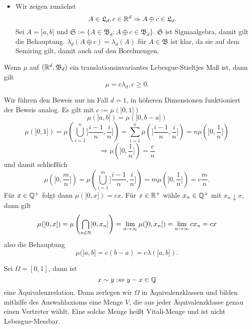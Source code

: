 			\begin{bew}
				$\text{   }$
				\begin{itemize}
					\item Wir zeigen zunächst
					\[  A\in\mathfrak{L}_d, c\in\mathbb{R}^d\Rightarrow A\oplus c\in \mathfrak{L}_d. \]
					Sei $A=]a,b]$ und $\mathfrak{S}:=\{A\in\mathfrak{B}_d: A\oplus c\in \mathfrak{B}_d\}$. $\mathfrak{S}$ ist Sigmaalgebra, damit gilt die Behauptung. $\lambda_d(A\oplus c)=\lambda_d(A)$ für $A\in\mathfrak{B}$ ist klar, da sie auf dem Semiring gilt, damit auch auf den Borelmengen. 
				\end{itemize}
			\end{bew}
			
			\begin{satz}
				Wenn $\mu$ auf $(\mathbb{R}^d, \mathfrak{B}_d)$ ein translationsinvariantes Lebesgue-Stieltjes Maß ist, dann gilt
				\[ \mu=c\lambda_d, c\ge 0. \]
			\end{satz}
			
			\begin{bew}
				Wir führen den Beweis nur im Fall $d=1$, in höheren Dimensionen funktioniert der Beweis analog.\newline
				Es gilt mit $c:=\mu(]0,1])$
				\[ \mu(]a,b])=\mu(]0,b-a]) \]
				\[ \mu(]0,1])=\mu\left(\bigcup_{i=1}^n ]\frac{i-1}{n},\frac{i}{n}]\right)=\sum_{i=1}^{n}\mu(]\frac{i-1}{n},\frac{i}{n}])=n\mu(]0,\frac{1}{n}])
				\]
				\[ \Rightarrow \mu(]0,\frac{1}{n}])=\frac{c}{n} \]
				und damit schließlich
				\[ \mu(]0,\frac{m}{n}])=\mu\left(\bigcup_{i=1}^m]\frac{i-1}{n},\frac{i}{n}]\right)=m\mu(]0,\frac{1}{n}])=c\frac{m}{n}. \]
				Für $x\in\mathbb{Q}^+$ folgt dann $\mu(]0,x])=cx$. Für $x\in\mathbb{R}^+$ wähle $x_n\in\mathbb{Q}^+$ mit $x_n\downarrow x$, dann gilt
				\[ \mu(]0,x])=\mu\left(\bigcap_{n\in\mathbb{N}} ]0,x_n]\right)=\lim\limits_{n\to\infty}\mu(]0,x_n])=\lim\limits_{n\to \infty}cx_n=cx \]
				also die Behauptung
				\[ \mu(]a,b]=c(b-a)=c\lambda(]a,b]). \]
			\end{bew}
			
			\begin{defi}
				Sei $\Omega=[0,1]$, dann ist 
				\[ x\sim y:\Leftrightarrow y-x\in \mathbb{Q} \]
				eine Äquivalenzrelation.\newline
				Dann zerlegen wir $\Omega$ in Äquivalenzklassen und bilden mithilfe des Auswahlaxioms eine Menge $V$, die aus jeder Äquivalenzklasse genau einen Vertreter wählt. Eine solche Menge heißt Vitali-Menge und ist nicht Lebesgue-Messbar.
			\end{defi}
			
